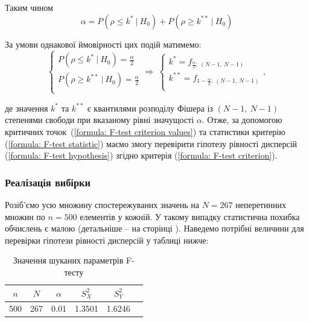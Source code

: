 Таким чином
\begin{equation*}
    \alpha=P(\rho\leqslant k^* \ |\ H_0) + P(\rho\geqslant k^{**}\ |\ H_0)
\end{equation*}

За умови однакової ймовірності цих подій матимемо:
\begin{equation}
    \begin{cases}
        P(\rho\leqslant k^* \ |\ H_0) = \frac{\alpha}{2} \\
        P(\rho\geqslant k^{**}\ |\ H_0) = \frac{\alpha}{2} \\
    \end{cases}
    \Rightarrow \
    \begin{cases}
        k^* = f_{\frac{\alpha}{2};\ (N-1,\ N-1)} \\
        k^{**} = f_{1-\frac{\alpha}{2};\ (N-1,\ N-1)} \\
    \end{cases}, \label{formula: F-test criterion values}
\end{equation}

де значення $k^*$ та $k^{**}$ є квантилями розподілу Фішера із $(N-1,\ N-1)$ степенями свободи при вказаному 
рівні значущості $\alpha$. Отже, за допомогою критичних точок~(\ref{formula: F-test criterion values})
та статистики критерію (\ref{formula: F-test statistic}) маємо змогу перевірити гіпотезу рівності дисперсій 
(\ref{formula: F-test hypothesis}) згідно критерія (\ref{formula: F-test criterion}).

\newpage
\subsubsection{Реалізація вибірки}

Розіб'ємо усю множину спостережуваних значень на $N=267$ неперетинних множин по $n=500$ елементів у кожній. 
У такому випадку статистична похибка обчислень є малою (детальніше -- на сторінці \pageref{page: UKR percentage point}). 
Наведемо потрібні величини для перевірки гіпотези рівності дисперсій у таблиці нижче:

\vspace{0.8cm}
\begin{table}[H]
    \begin{center}
        \begin{tabular}{||c|c|c|c|c|c||}
            \hline
            $n$ & $N$ & $\alpha$ & $S_X^2$ & $S_Y^2$ \\
            \hline \hline
            500 & 267 & 0.01 & 1.3501 & 1.6246 \\
            \hline
        \end{tabular}
        \caption{Значення шуканих параметрів F-тесту}
        \label{table: UKR F-test}
    \end{center}
\end{table}

